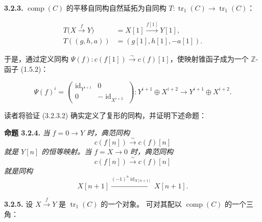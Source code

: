\clearpage
{}%
\noindent\textbf{3.2.3.}\quad
{}
$\operatorname{comp}(C)$ 的平移自同构自然延拓为自同构
$T\colon\operatorname{tr}_1(C)\longrightarrow\operatorname{tr}_1(C)$：

\begin{equation}
  \begin{aligned}
    T\bigl(X\xrightarrow{f}Y\bigr)
      &=X[1]\xrightarrow{f[1]}Y[1],\\
    T((g,h,a))&=(g[1],h[1],-a[1]).
  \end{aligned}
  \tag{3.2.3.1}
\end{equation}

于是，通过定义同构
$\Psi(f)\colon c(f[1])\xrightarrow{\sim}c(f)[1]$，使映射锥函子成为一个
$\mathbb Z$-函子 (1.5.2)：

\begin{equation}
  \Psi(f)^i=
  \begin{pmatrix}
    \operatorname{id}_{Y^{i+1}} & 0\\
    0 & -\operatorname{id}_{X^{i+2}}
  \end{pmatrix}
  \colon Y^{i+1}\oplus X^{i+2}
  \longrightarrow Y^{i+1}\oplus X^{i+2}.
  \tag{3.2.3.2}
\end{equation}

读者将验证 (3.2.3.2) 确实定义了复形的同构，并证明下述命题：

\noindent\textbf{命题 3.2.4.}\quad
{}
\emph{当 $f=0\longrightarrow Y$ 时，典范同构}
\begin{equation*}
  c(f[n])\xrightarrow{\sim}c(f)[n]
\end{equation*}
\emph{就是 $Y[n]$ 的恒等映射。当 $f=X\longrightarrow0$ 时，典范同构}
\begin{equation*}
  c(f[n])\xrightarrow{\sim}c(f)[n]
\end{equation*}
\emph{就是同构}
\begin{equation*}
  X[n+1]\xrightarrow{(-1)^n\operatorname{id}_{X[n+1]}}X[n+1].
\end{equation*}

\noindent\textbf{3.2.5.}\quad
设 $X\xrightarrow{f}Y$ 是 $\operatorname{tr}_1(C)$ 的一个对象。
可对其配以 $\operatorname{comp}(C)$ 的一个三角：

